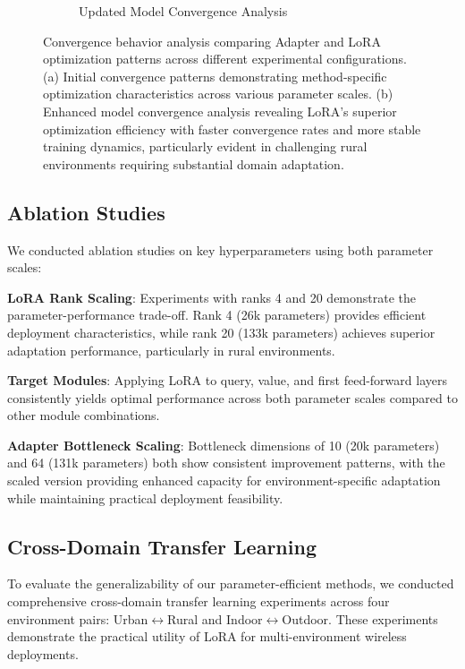 \documentclass[conference]{IEEEtran}
\begin{document}
\begin{figure}[t]
\begin{subfigure}[b]{0.48\textwidth}
\caption{Updated Model Convergence Analysis}
\label{fig:convergence_updated}
\end{subfigure}
\caption{Convergence behavior analysis comparing Adapter and LoRA optimization patterns across different experimental configurations. (a) Initial convergence patterns demonstrating method-specific optimization characteristics across various parameter scales. (b) Enhanced model convergence analysis revealing LoRA's superior optimization efficiency with faster convergence rates and more stable training dynamics, particularly evident in challenging rural environments requiring substantial domain adaptation.}
\label{fig:convergence}
\end{figure}

\subsection{Ablation Studies}

We conducted ablation studies on key hyperparameters using both parameter scales:

\textbf{LoRA Rank Scaling}: Experiments with ranks 4 and 20 demonstrate the parameter-performance trade-off. Rank 4 (26k parameters) provides efficient deployment characteristics, while rank 20 (133k parameters) achieves superior adaptation performance, particularly in rural environments.

\textbf{Target Modules}: Applying LoRA to query, value, and first feed-forward layers consistently yields optimal performance across both parameter scales compared to other module combinations.

\textbf{Adapter Bottleneck Scaling}: Bottleneck dimensions of 10 (20k parameters) and 64 (131k parameters) both show consistent improvement patterns, with the scaled version providing enhanced capacity for environment-specific adaptation while maintaining practical deployment feasibility.

\subsection{Cross-Domain Transfer Learning}

To evaluate the generalizability of our parameter-efficient methods, we conducted comprehensive cross-domain transfer learning experiments across four environment pairs: Urban$\leftrightarrow$Rural and Indoor$\leftrightarrow$Outdoor. These experiments demonstrate the practical utility of LoRA for multi-environment wireless deployments.
\end{document}
